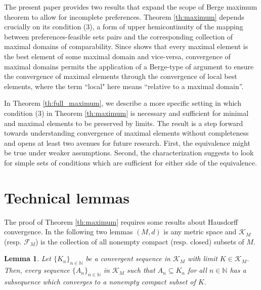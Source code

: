 \documentclass[12pt, oneside]{amsart}
\newtheorem{lemma}{Lemma}
\theoremstyle{definition}
\begin{document}
The present paper provides two results that expand the scope of Berge maximum theorem to allow for incomplete preferences. Theorem \ref{th:maximum} depends crucially on its condition (3), a form of upper hemicontinuity of the mapping between preferences-feasible sets pairs and the corresponding collection of maximal domains of comparability. Since \citet*{Gorno2018} shows that every maximal element is the best element of some maximal domain and vice-versa, convergence of maximal domains permits the application of a Berge-type of argument to ensure the convergence of maximal elements through the convergence of local best elements, where the term ``local" here means ``relative to a maximal domain''. 

In Theorem \ref{th:full_maximum}, we describe a more specific setting in which condition (3) in Theorem \ref{th:maximum} is necessary and sufficient for minimal and maximal elements to be preserved by limits. The result is a step forward towards understanding convergence of maximal elements without completeness and opens at least two avenues for future research. First, the equivalence might be true under weaker assumptions. Second, the characterization suggests to look for simple sets of conditions which are sufficient for either side of the equivalence.





\section{Technical lemmas}
\label{sec:proofs}

The proof of Theorem \ref{th:maximum} requires some results about Hausdorff convergence. In the following two lemmas $(M,d)$ is any metric space and $\mathcal{K}_M$ (resp. $\mathcal{F}_M$) is the collection of all nonempty compact (resp. closed) subsets of $M$.

\begin{lemma}
\label{lemma:subsequence}
Let $\{K_n\}_{n \in \mathbb{N}}$ be a convergent sequence in $\mathcal{K}_M$ with limit $K \in \mathcal{K}_M$. Then, every sequence $\{A_n\}_{n \in \mathbb{N}}$ in $\mathcal{K}_M$ such that $A_n \subseteq K_n$ for all $n\in \mathbb{N}$ has a subsequence which converges to a nonempty compact subset of $K$.
\end{lemma}
\end{document}
